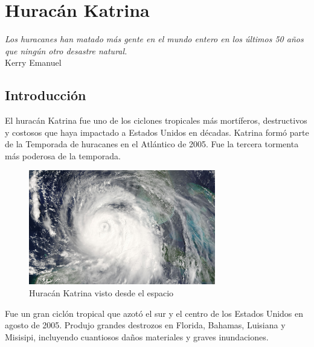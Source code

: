 \chapter{Huracán Katrina} \label{cap0b}

\begin{flushright}
\begin{minipage}{7.85cm}
    {\em Los huracanes han matado más gente en el mundo entero en los últimos
    50 años que ningún otro desastre natural.} \\ Kerry Emanuel
\end{minipage}
\end{flushright}

\vspace*{5mm}

\section{Introducción}

El huracán Katrina fue uno de los ciclones tropicales más mortíferos,
destructivos y costosos que haya impactado a Estados Unidos en décadas. Katrina
formó parte de la Temporada de huracanes en el Atlántico de 2005. Fue la tercera
tormenta más poderosa de la temporada.

\begin{figure}[H]
 \centering
 \includegraphics[height=50mm]{figuras/cap0/hurricane.png}
 \caption{Huracán Katrina visto desde el espacio}
\end{figure}

Fue un gran ciclón tropical que azotó el sur y el centro de los Estados Unidos
en agosto de 2005. Produjo grandes destrozos en Florida, Bahamas, Luisiana y
Misisipi, incluyendo cuantiosos daños materiales y graves inundaciones.

